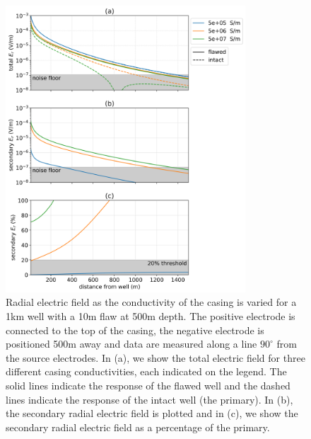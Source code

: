 \begin{figure}
    \begin{center}
    \includegraphics[width=0.8\textwidth]{figures/integrity_conductivity_casing.png}
    \end{center}
\caption{
    Radial electric field as the conductivity of the casing is varied for a 1km well with a 10m flaw at 500m depth.
    The positive electrode is connected to the top of the casing, the negative electrode
    is positioned 500m away and data are measured along a line $90^\circ$ from the
    source electrodes. In (a), we show the total electric field for three different casing conductivities,
    each indicated on the legend. The solid lines indicate the response of the flawed well and the dashed lines indicate the response of the intact well (the primary).
    In (b), the secondary radial electric field is plotted and in (c), we show the
    secondary radial electric field as a percentage of the primary.
}
\label{fig:integrity_conductivity_casing}
\end{figure}
